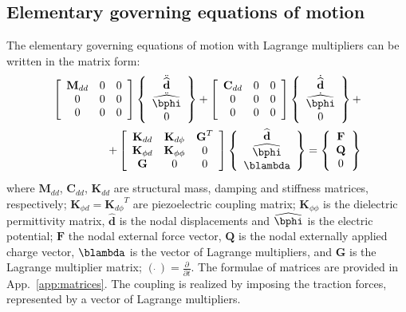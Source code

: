 \documentclass[a4paper,12pt]{article}
\begin{document}
{\subsection{Elementary governing equations of motion}
\label{sec:motion}
The elementary governing equations of motion with Lagrange multipliers can be written in the matrix form:
\begin{eqnarray}
\left[
\begin{array}{ccc}
\textbf{M}_{dd} & 0 & 0\\
0 & 0 & 0\\
0 & 0 & 0
\end{array} \right]
\left \{
\begin{array}{c}
\ddot{\widehat{\textbf{d}}}\\
\ddot{\widehat{\bphi}}\\
0
\end{array} \right \}+
\left[
\begin{array}{ccc}
\textbf{C}_{dd} & 0 & 0\\
0 & 0 & 0\\
0 & 0 & 0
\end{array} \right]
\left \{
\begin{array}{c}
\dot{\widehat{\textbf{d}}}\\
\dot{\widehat{\bphi}}\\
0
\end{array} \right \}+\nonumber\\
+\left[
\begin{array}{ccc}
\textbf{K}_{dd} & \textbf{K}_{d\phi} & {\textbf{G}}^T\\
\textbf{K}_{\phi d} & \textbf{K}_{\phi \phi} & 0\\
\textbf{G} & 0 & 0
\end{array} \right]
\left \{
\begin{array}{c}
\widehat{\textbf{d}}\\
\widehat{\bphi}\\
\blambda
\end{array} \right \}=
\left \{
\begin{array}{c}
\textbf{F}\\
\textbf{Q}\\
0
\end{array} \right \}
\label{eq:motion}
\end{eqnarray}
where \(\textbf{M}_{dd}\), \(\textbf{C}_{dd}\), \(\textbf{K}_{dd}\) are 
structural mass, damping and stiffness matrices, respectively; 
\(\textbf{K}_{\phi 
d}={\textbf{K}_{d\phi}}^T\) are piezoelectric coupling matrix; 
\(\textbf{K}_{\phi 
\phi}\) is the dielectric permittivity matrix, \(\widehat{\textbf{d}}\) is the 
nodal displacements and \(\widehat{\bphi}\) is the electric potential; 
\(\textbf{F}\) the nodal external force vector, \(\textbf{Q}\) is the nodal 
externally applied charge vector, \(\blambda\) is the vector of Lagrange 
multipliers, and \(\textbf{G}\) is the Lagrange multiplier matrix; \((\dot{\ 
})=\frac{\partial}{\partial t}\).
The formulae of matrices are provided in App.~\ref{app:matrices}.
The coupling is realized by imposing the traction forces, represented by a vector of Lagrange multipliers. 

}
\end{document}
